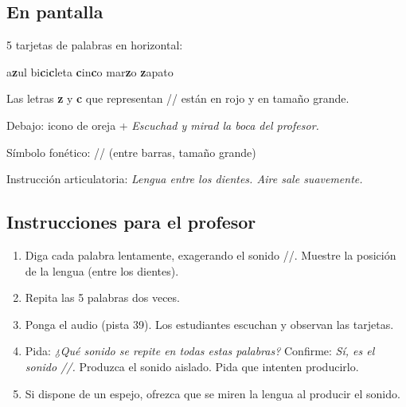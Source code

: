 \documentclass[a4paper,11pt]{article}
\begin{document}
\vspace{0.5cm}

\subsection*{En pantalla}

5 tarjetas de palabras en horizontal:

\begin{center}
{\Large
a\textbf{\textcolor{rojog}{z}}ul \quad\quad
bi\textbf{\textcolor{rojog}{c}}i\textbf{\textcolor{rojog}{c}}leta \quad\quad
\textbf{\textcolor{rojog}{c}}in\textbf{\textcolor{rojog}{c}}o \quad\quad
mar\textbf{\textcolor{rojog}{z}}o \quad\quad
\textbf{\textcolor{rojog}{z}}apato
}
\end{center}

\vspace{0.3cm}

Las letras \textbf{z} y \textbf{c} que representan /\texttheta/ están en rojo y en tamaño grande.

\vspace{0.3cm}

Debajo: icono de oreja + \textit{Escuchad y mirad la boca del profesor.}

\vspace{0.2cm}

Símbolo fonético: {\Large /\texttheta/} (entre barras, tamaño grande)

\vspace{0.2cm}

Instrucción articulatoria: \textit{Lengua entre los dientes. Aire sale suavemente.}

\vspace{0.5cm}

\subsection*{Instrucciones para el profesor}

\begin{enumerate}[leftmargin=1.5cm, itemsep=4pt]
\item Diga cada palabra lentamente, exagerando el sonido /\texttheta/. Muestre la posición de la lengua (entre los dientes).
\item Repita las 5 palabras dos veces.
\item Ponga el audio (pista 39). Los estudiantes escuchan y observan las tarjetas.
\item Pida: \textit{¿Qué sonido se repite en todas estas palabras?} Confirme: \textit{Sí, es el sonido /\texttheta/.} Produzca el sonido aislado. Pida que intenten producirlo.
\item Si dispone de un espejo, ofrezca que se miren la lengua al producir el sonido.
\end{enumerate}
\end{document}

